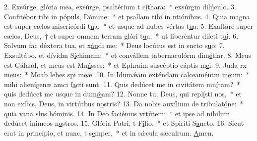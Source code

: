 2. Exsúrge, glória mea, exsúrge, psaltérium t c\uline{í}thara:~* exsúrgm dil\uline{ú}culo.
3. Confitébor tibi in pópuls, D\uline{ó}mine:~* et psallam tibi in nti\uline{ó}nibus.
4. Quia magna est super cælos misericórdi t\uline{u}a:~* et usque ad nubes vértas t\uline{u}a:
5. Exaltáre super cælos, Deus,~† et super omnem terram glóri t\uline{u}a:~* ut liberéntur dilcti t\uline{u}i.
6. Salvum fac déxtera tua, et x\uline{áu}di me:~* Deus locútus est in sncto s\uline{u}o:
7. Exsultábo, et dívidm S\uline{í}chimam:~* et convállem tabernaculórm dim\uline{é}tiar.
8. Meus est Gálaad, et meus est Mn\uline{á}sses:~* et Ephraim suscéptio cáptis m\uline{e}i.
9. Juda rx m\uline{e}us:~* Moab lebes spi m\uline{e}æ.
10. In Idumǽam exténdam calceaméntm m\uline{e}um:~* mihi alienígenæ amci f\uline{a}cti sunt.
11. Quis dedúcet me in civitátem mn\uline{í}tam?~* quis dedúcet me usque in dum\uline{ǽ}am?
12. Nonne tu, Deus, qui repl\uline{í}sti nos,~* et non exíbis, Deus, in virtútbus n\uline{o}stris?
13. Da nobis auxílium de tribulat\uline{ó}ne:~* quia vana slus h\uline{ó}minis.
14. In Deo faciémus vrt\uline{ú}tem:~* et ipse ad níhilum dedúcet inimcos n\uline{o}stros.
15. Glória Patri, t F\uline{í}lio,~* et Spiríti S\uline{a}ncto.
16. Sicut erat in princípio, et nunc, t s\uline{e}mper,~* et in sǽcula sæculrum. \uline{A}men.
